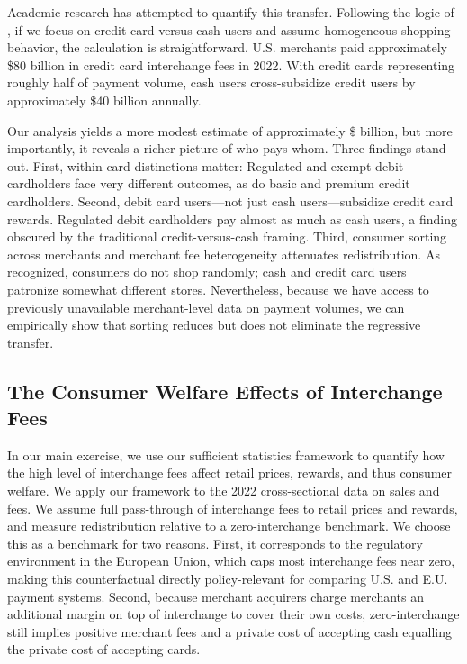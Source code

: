 \documentclass[main.tex]{subfiles}
\begin{document}
Academic research has attempted to quantify this transfer. Following the logic of \citet{schuh2010gains}, if we focus on credit card versus cash users and assume homogeneous shopping behavior, the calculation is straightforward. U.S. merchants paid approximately \$80 billion in credit card interchange fees in 2022. With credit cards representing roughly half of payment volume, cash users cross-subsidize credit users by approximately \$40 billion annually.

Our analysis yields a more modest estimate of approximately \$ billion, but more importantly, it reveals a richer picture of who pays whom. Three findings stand out. First, within-card distinctions matter: Regulated and exempt debit cardholders face very different outcomes, as do basic and premium credit cardholders. Second, debit card users---not just cash users---subsidize credit card rewards. Regulated debit cardholders pay almost as much as cash users, a finding obscured by the traditional credit-versus-cash framing. Third, consumer sorting across merchants and merchant fee heterogeneity attenuates redistribution. As \citet{Gans2018} recognized, consumers do not shop randomly; cash and credit card users patronize somewhat different stores. Nevertheless, because we have access to previously unavailable merchant-level data on payment volumes, we can empirically show that sorting reduces but does not eliminate the regressive transfer.


\subsection{The Consumer Welfare Effects of Interchange Fees\label{subsec:eliminate-interchange}}

In our main exercise, we use our sufficient statistics framework to quantify how the high level of interchange fees affect retail prices, rewards, and thus consumer welfare.
We apply our framework to the 2022 cross-sectional data on sales and fees.
We assume full pass-through of interchange fees to retail prices and rewards, and measure redistribution relative to a zero-interchange benchmark.
We choose this as a benchmark for two reasons.
First, it corresponds to the regulatory environment in the European Union, which caps most interchange fees near zero, making this counterfactual directly policy-relevant for comparing U.S. and E.U. payment systems.
Second, because merchant acquirers charge merchants an additional margin on top of interchange to cover their own costs, zero-interchange still implies positive merchant fees and a private cost of accepting cash equalling the private cost of accepting cards.
\end{document}
